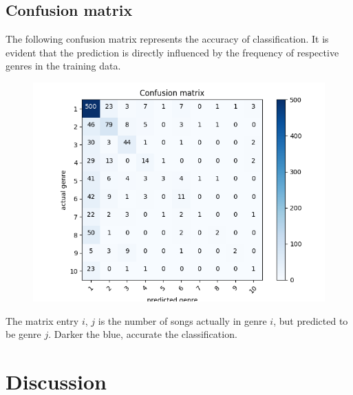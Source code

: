 \documentclass[fleqn,10pt]{SelfArx} %
\begin{document}
\subsection{Confusion matrix}
The following confusion matrix represents the accuracy of classification. It is evident that the prediction is directly influenced by the frequency of respective genres in the training data.
\begin{figure}[H]
  \includegraphics[width=\linewidth]{confusion-matrix.jpg}
\end{figure}

The matrix entry $i$, $j$ is the number of songs actually in genre $i$, but predicted to be genre $j$. Darker the blue, accurate the classification.

\section{Discussion}



\end{document}
